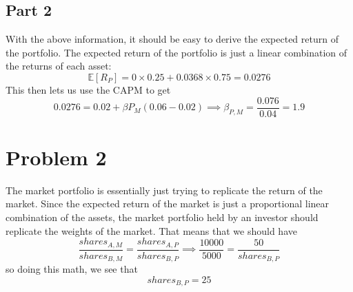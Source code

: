 \documentclass[12pt, letterpaper, parskip = full]{article}
\newcommand{\Ex}[1]{\mathbb{E}\left[#1\right]}
\begin{document}
    \subsection{Part 2}

    With the above information, it should be easy to derive the expected return of the portfolio. The expected return of the portfolio is just a linear combination of the returns of each asset:
    \[ \Ex{R_P} = 0 \times 0.25 + 0.0368 \times 0.75 = 0.0276   \]
    This then lets us use the CAPM to get
    \[ 0.0276 = 0.02 + \beta{P_M} (0.06 - 0.02) \implies \boxed{\beta_{P,M} = \frac{0.076}{0.04} = 1.9}   \]

    \section{Problem 2}

    The market portfolio is essentially just trying to replicate the return of the market. Since the expected return of the market is just a proportional linear combination of the assets, the market portfolio held by an investor should replicate the weights of the market. That means that we should have
    \[ \frac{shares_{A,M}}{shares_{B,M}} = \frac{shares_{A,P}}{shares_{B,P}} \implies \frac{10000}{5000} = \frac{50}{shares_{B,P}}  \]
    so doing this math, we see that
    \[ \boxed{shares_{B,P} = 25}   \]
\end{document}
